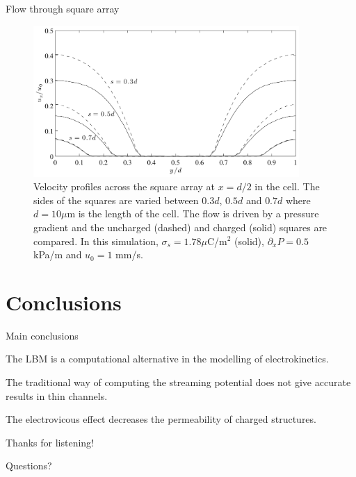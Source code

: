 \begin{frame}{Flow through square array}

\begin{figure}
\begin{center}
\includegraphics[width=0.9\textwidth]{../fig/square_u_mid.pdf}
\end{center}
\caption{Velocity profiles across the square array at $x = d/2$ in the
  cell. The sides of the squares are varied between $0.3d$, $0.5d$ and
  $0.7d$ where $d = 10 \mu$m is the length of the cell. The flow is
  driven by a pressure gradient and the uncharged (dashed) and charged
  (solid) squares are compared. In this simulation, $\sigma_s = 1.78
  \mu$C/m$^2$ (solid), $\partial_xP = 0.5$ kPa/m and $u_0 = 1$ mm/s. }
\label{fig:res:mid}
\end{figure}

\end{frame}

\section{Conclusions}

\begin{frame}{Main conclusions}

\begin{itemize*}

\item The LBM is a computational alternative in the modelling of
  electrokinetics.

\item The traditional way of computing the streaming potential does
  not give accurate results in thin channels. 

\item The electrovicous effect decreases the permeability of charged
  structures. 

\end{itemize*}

\end{frame}


\begin{frame}

\begin{center}
\Huge{Thanks for listening!}
\end{center}

\begin{center}
\Huge{Questions?}
\end{center}
\end{frame}
